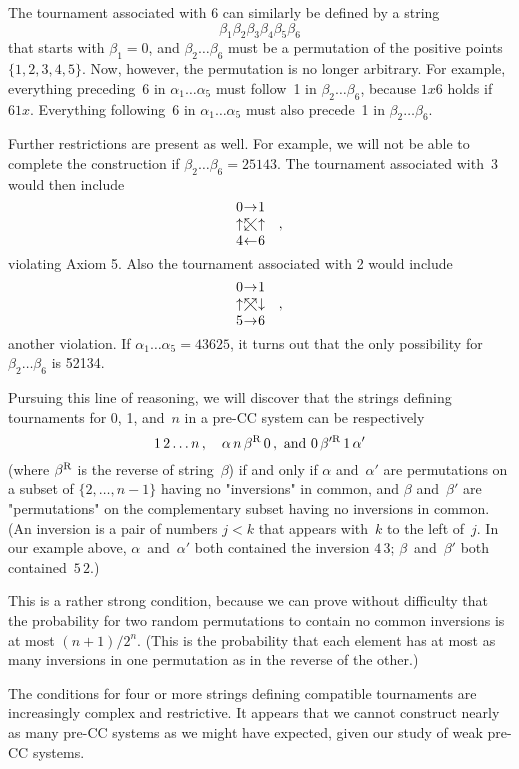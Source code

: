 The tournament associated with 6 can similarly be defined by a string
$$\beta_1\beta_2\beta_3\beta_4\beta_5\beta_6$$ that starts with
$\beta_1=0$, and $\beta_2\ldots\beta_6$ must be a permutation of the
positive points $\{1,2,3,4,5\}$. Now, however, the permutation is no
longer arbitrary. For example, everything preceding~6 in
$\alpha_1\ldots\alpha_5$ must follow~1 in $\beta_2\ldots\beta_6$,
because $1x 6$ holds if~$61x$. Everything following~6 in
$\alpha_1\ldots\alpha_5$ must also precede~1 in
$\beta_2\ldots\beta_6$.

Further restrictions are present as well.
For example, we will not be able to complete the construction if
$\beta_2\ldots\beta_6=25143$. The tournament associated with~3 would
then include
$$\vcenter{\halign{%
$\hfil#\hfil\;$&$\hfil#\hfil\;$&$\hfil#\hfil$\quad%
&$\hfil#\hfil$\cr
0&\ra&1\cr
\ua&\luparrow&\ua&,\cr
4&\la&6\cr}}$$
violating Axiom 5. Also the tournament associated with 2 would include
$$\vcenter{\halign{%
$\hfil#\hfil\;$&$\hfil#\hfil\;$&$\hfil#\hfil$\quad%
&$\hfil#\hfil$\cr
0&\ra&1\cr
\ua&\uuparrow&\da&,\cr
5&\ra&6\cr}}$$
another violation. If $\alpha_1\ldots\alpha_5=43625$, it turns out
that the only possibility for $\beta_2\ldots\beta_6$ is 52134.

Pursuing this line of reasoning, we will discover that the strings
defining tournaments for 0, 1, and~$n$ in a pre-CC system can be
respectively 
$$1\,2\ldots n\,,\quad \alpha\,n\,\beta^{\rm R}\,0\,,\hbox{ and }
0\,\beta'^{\rm R}\,1\,\alpha'$$
 (where $\beta^{\rm R}$ is the reverse of
string~$\beta$) if and only if $\alpha$ and~$\alpha'$ are permutations
on a subset of $\{2,\ldots,n-1\}$ having no "inversions" in common, and
$\beta$ and~$\beta'$ are "permutations" on the complementary subset
having no inversions in common. (An inversion is a pair of numbers
$j<k$ that appears with~$k$ to the left of~$j$. In our example above,
$\alpha$~and~$\alpha'$ both contained the inversion $4\,3$;
$\beta$~and~$\beta'$ both contained~$5\,2$.)

This is a rather strong condition, because we can prove without
difficulty that the probability for 
two random permutations to contain no common
inversions is at most $(n+1)/2^n$. (This is the
probability that each element has at most as many inversions in one
permutation as in the reverse of the other.)

The conditions for four or more strings defining compatible
tournaments are increasingly complex and restrictive. It appears that
we cannot construct nearly as many pre-CC systems as we might have
expected, given our study of weak pre-CC systems.

